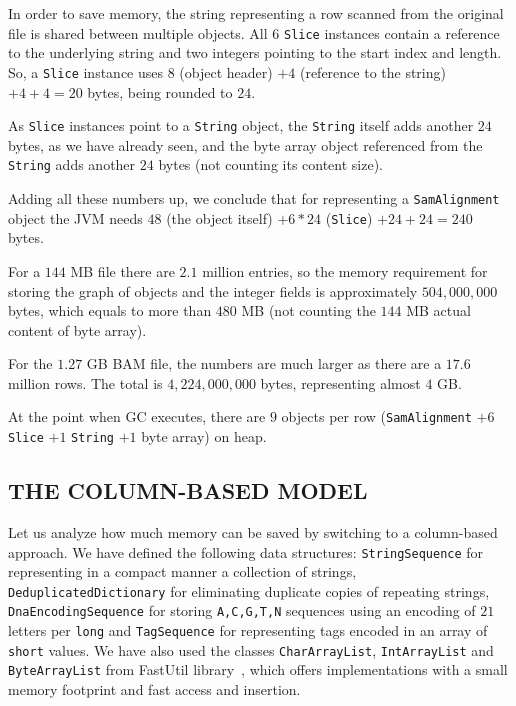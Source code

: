 \documentclass[a4paper,twoside]{article}
\begin{document}
In order to save memory, the string representing a row scanned from the original file is shared between multiple objects.
All $6$ {\texttt{Slice}} instances contain a reference to the  underlying string and two integers pointing to the start index and length.
So, a {\texttt{Slice}} instance uses $8$ (object header) $+4$ (reference to the string) $ + 4 + 4 = 20$ bytes, being rounded to $24$.

As {\texttt{Slice}} instances point to a {\texttt{String}} object, the {\texttt{String}} itself adds another $24$ bytes, as we have already seen, and the byte array object referenced from the {\texttt{String}} adds another $24$ bytes (not counting its content size).


Adding all these numbers up, we conclude that for representing a {\texttt{SamAlignment}} object the JVM needs $48$ (the object itself) $ + 6*24$ (\texttt{Slice}) $ + 24 + 24 = 240$ bytes.

For a $144$ MB file there are $2.1$ million entries, so the memory requirement for storing the graph of objects and the integer fields is approximately $504,000,000$ bytes, which equals to more than $480$ MB (not counting the $144$ MB actual content of byte array).

For the $1.27$ GB BAM file, the numbers are much larger as there are a $17.6$ million rows.
The total is $4,224,000,000$ bytes, representing almost $4$ GB\@.

At the point when GC executes, there are $9$ objects per row
({\texttt{SamAlignment}} $+ 6$ {\texttt{Slice}} $+ 1$ {\texttt{String}} $+ 1$ byte array) on heap.


\subsection{\uppercase{The Column-Based Model}} 
\label{subsec:column}

Let us analyze how much memory can be saved by switching to a column-based approach.
We have defined the following data structures: {\texttt{StringSequence}} for representing in a compact manner a collection of strings, {\texttt{DeduplicatedDictionary}} for eliminating duplicate copies of repeating strings, {\texttt{DnaEncodingSequence}} for storing {\texttt{A,C,G,T,N}} sequences using an encoding of $21$ letters per {\texttt{long}} and {\texttt{TagSequence}} for representing tags encoded in an array of {\texttt{short}} values.
We have also used the classes {\texttt{CharArrayList}}, {\texttt{IntArrayList}} and {\texttt{ByteArrayList}} from FastUtil library~\cite{fastutil}, which offers implementations with a small memory footprint and fast access and insertion.
\end{document}

